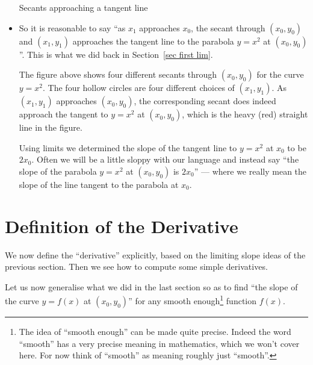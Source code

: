 \begin{eg}
\begin{itemize}
\begin{sfig}
\begin{center}
   Secants approaching a tangent line
  \end{center}
\end{sfig}

\noindent
\item So it is reasonable to say ``as $x_1$ approaches $x_0$, the secant through
$(x_0,y_0)$ and $(x_1,y_1)$ approaches the tangent line to the parabola $y=x^2$ at
$(x_0,y_0)$''. This is what we did back in Section~\ref{sec first lim}.

The figure above shows four different secants through $(x_0,y_0)$ for the curve $y=x^2$.
The four hollow circles are four different choices of $(x_1,y_1)$. As $(x_1,y_1)$
approaches $(x_0,y_0)$, the corresponding secant does indeed approach the tangent to
$y=x^2$ at $(x_0,y_0)$, which is the heavy (red) straight line in the figure.

Using limits we determined the slope of the tangent line to $y=x^2$ at $x_0$ to be
$2x_0$. Often we will be a little sloppy with our language and instead say ``the
slope of the parabola $y=x^2$ at $(x_0,y_0)$ is $2x_0$'' --- where we really mean the
slope of the line tangent to the parabola at $x_0$.



\end{itemize}
\end{eg}

\section{Definition of the Derivative} \label{sec def deriv}
We now define the ``derivative'' explicitly, based on the limiting
slope ideas of the previous section. Then we see how to compute some simple
derivatives.

Let us now generalise what we did in the last section so as
to find ``the slope of the curve $y=f(x)$ at $(x_0,y_0)$''
for any smooth enough\footnote{The idea of ``smooth enough'' can be made
quite precise. Indeed the word ``smooth'' has a very precise
meaning in mathematics, which we won't cover here. For now think of
``smooth'' as meaning roughly just ``smooth''.} function $f(x)$.


